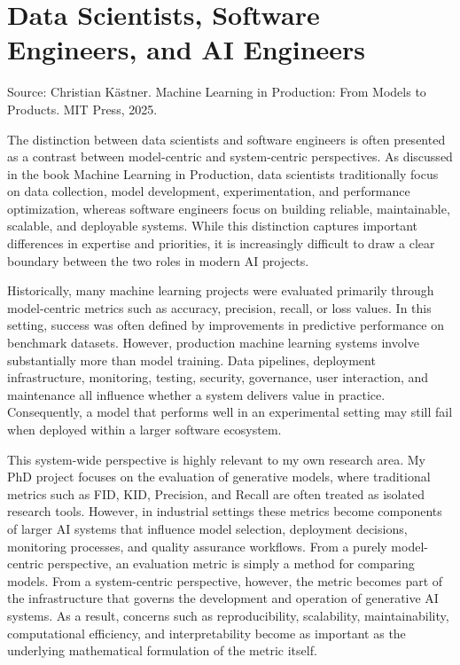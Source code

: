\documentclass{article}
\begin{document}
\section{Data Scientists, Software Engineers, and AI Engineers}

Source: \cite{kaestner2025mlip} Christian Kästner. Machine Learning in Production: From Models to Products. MIT Press, 2025.

The distinction between data scientists and software engineers is often presented as a contrast between model-centric and system-centric perspectives. As discussed in the book Machine Learning in Production, data scientists traditionally focus on data collection, model development, experimentation, and performance optimization, whereas software engineers focus on building reliable, maintainable, scalable, and deployable systems. While this distinction captures important differences in expertise and priorities, it is increasingly difficult to draw a clear boundary between the two roles in modern AI projects.

Historically, many machine learning projects were evaluated primarily through model-centric metrics such as accuracy, precision, recall, or loss values. In this setting, success was often defined by improvements in predictive performance on benchmark datasets. However, production machine learning systems involve substantially more than model training. Data pipelines, deployment infrastructure, monitoring, testing, security, governance, user interaction, and maintenance all influence whether a system delivers value in practice. Consequently, a model that performs well in an experimental setting may still fail when deployed within a larger software ecosystem.

This system-wide perspective is highly relevant to my own research area. My PhD project focuses on the evaluation of generative models, where traditional metrics such as FID, KID, Precision, and Recall are often treated as isolated research tools. However, in industrial settings these metrics become components of larger AI systems that influence model selection, deployment decisions, monitoring processes, and quality assurance workflows. From a purely model-centric perspective, an evaluation metric is simply a method for comparing models. From a system-centric perspective, however, the metric becomes part of the infrastructure that governs the development and operation of generative AI systems. As a result, concerns such as reproducibility, scalability, maintainability, computational efficiency, and interpretability become as important as the underlying mathematical formulation of the metric itself.
\end{document}
